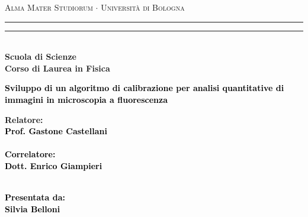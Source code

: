 \documentclass[12pt,a4paper]{report}
\begin{document}
\begin{titlepage}

%
%
%
\begin{center}
{{\Large{\textsc{Alma Mater Studiorum $\cdot$ Universit\`a di Bologna}}}} 
\rule[0.1cm]{15.8cm}{0.1mm}
\rule[0.5cm]{15.8cm}{0.6mm}
\\\vspace{3mm}
%
%
{\small{\bf Scuola di Scienze \\ Corso di Laurea in Fisica}}

\end{center}

\vspace{23mm}

\begin{center}\textcolor{black}{
%
%
%
{\LARGE{\bf Sviluppo di un algoritmo di calibrazione per analisi quantitative di immagini in microscopia a fluorescenza}}\\
}\end{center}

\vspace{50mm} \par \noindent

\begin{minipage}[t]{0.47\textwidth}
%
%
{\large{\bf Relatore: \vspace{2mm}\\\textcolor{black}{
Prof. Gastone Castellani}\\\\
%
%
%
\textcolor{black}{
\bf Correlatore:
\vspace{2mm}\\
Dott. Enrico Giampieri \\\\}}}
\end{minipage}
%
\hfill
%
\begin{minipage}[t]{0.47\textwidth}\raggedleft \textcolor{black}{
{\large{\bf Presentata da:
\vspace{2mm}\\
Silvia Belloni}}}
\end{minipage}


\end{titlepage}
\end{document}

